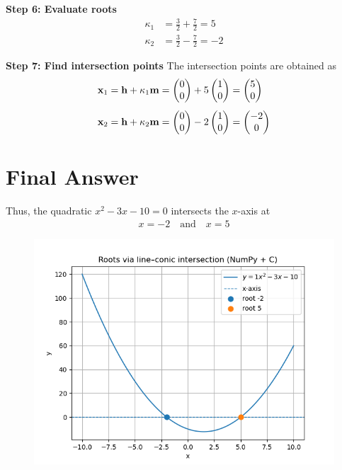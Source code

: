 \documentclass[12pt]{article}
\begin{document}
\noindent\textbf{Step 6: Evaluate roots}  
\begin{align}
\kappa_1 &= \tfrac{3}{2} + \tfrac{7}{2} = 5 \\
\kappa_2 &= \tfrac{3}{2} - \tfrac{7}{2} = -2
\end{align}

\noindent\textbf{Step 7: Find intersection points}  
The intersection points are obtained as
\begin{align}
\mathbf{x}_1 &= \mathbf{h} + \kappa_1 \mathbf{m} 
= \begin{pmatrix}0 \\ 0\end{pmatrix} + 5\begin{pmatrix}1 \\ 0\end{pmatrix} = \begin{pmatrix}5 \\ 0\end{pmatrix} \\[1ex]
\mathbf{x}_2 &= \mathbf{h} + \kappa_2 \mathbf{m} 
= \begin{pmatrix}0 \\ 0\end{pmatrix} - 2\begin{pmatrix}1 \\ 0\end{pmatrix} = \begin{pmatrix}-2 \\ 0\end{pmatrix}
\end{align}

\section*{Final Answer}

Thus, the quadratic $x^2 - 3x - 10 = 0$ intersects the $x$-axis at
\begin{align}
\boxed{x = -2 \quad \text{and} \quad x = 5}
\end{align}

\begin{figure}[H]
    \centering
    \includegraphics[width=0.9\linewidth]{figs/parabola.png}
    \caption{}
    \label{fig:placeholder}
\end{figure}
\end{document}
